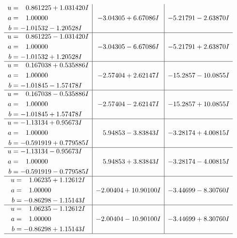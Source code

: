 \documentclass[1p]{elsarticle_modified}
\theoremstyle{definition}
\begin{document}
$$\begin{array}{c|c|c}
\begin{aligned}
u &= \phantom{-}0.861225 + 1.031420 I \\
a &= \phantom{-}1.00000\phantom{ +0.000000I} \\
b &= -1.01532 - 1.20528 I\end{aligned}
 & -3.04305 + 6.67086 I & -5.21791 - 2.63870 I \\ \hline\begin{aligned}
u &= \phantom{-}0.861225 - 1.031420 I \\
a &= \phantom{-}1.00000\phantom{ +0.000000I} \\
b &= -1.01532 + 1.20528 I\end{aligned}
 & -3.04305 - 6.67086 I & -5.21791 + 2.63870 I \\ \hline\begin{aligned}
u &= \phantom{-}0.167038 + 0.535886 I \\
a &= \phantom{-}1.00000\phantom{ +0.000000I} \\
b &= -1.01845 - 1.57478 I\end{aligned}
 & -2.57404 + 2.62147 I & -15.2857 - 10.0855 I \\ \hline\begin{aligned}
u &= \phantom{-}0.167038 - 0.535886 I \\
a &= \phantom{-}1.00000\phantom{ +0.000000I} \\
b &= -1.01845 + 1.57478 I\end{aligned}
 & -2.57404 - 2.62147 I & -15.2857 + 10.0855 I \\ \hline\begin{aligned}
u &= -1.13134 + 0.95673 I \\
a &= \phantom{-}1.00000\phantom{ +0.000000I} \\
b &= -0.591919 + 0.779585 I\end{aligned}
 & \phantom{-}5.94853 - 3.83843 I & -3.28174 + 4.00815 I \\ \hline\begin{aligned}
u &= -1.13134 - 0.95673 I \\
a &= \phantom{-}1.00000\phantom{ +0.000000I} \\
b &= -0.591919 - 0.779585 I\end{aligned}
 & \phantom{-}5.94853 + 3.83843 I & -3.28174 - 4.00815 I \\ \hline\begin{aligned}
u &= \phantom{-}1.06235 + 1.12612 I \\
a &= \phantom{-}1.00000\phantom{ +0.000000I} \\
b &= -0.86298 - 1.15143 I\end{aligned}
 & -2.00404 + 10.90100 I & -3.44699 - 8.30760 I \\ \hline\begin{aligned}
u &= \phantom{-}1.06235 - 1.12612 I \\
a &= \phantom{-}1.00000\phantom{ +0.000000I} \\
b &= -0.86298 + 1.15143 I\end{aligned}
 & -2.00404 - 10.90100 I & -3.44699 + 8.30760 I\\
 \hline 
 \end{array}$$\newpage\newpage\renewcommand{\arraystretch}{1}
\end{document}
